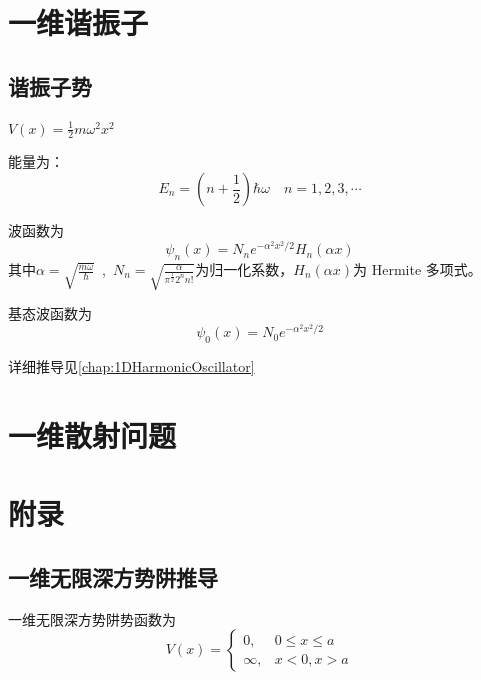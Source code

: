\documentclass[12pt, a4paper, oneside, UTF8]{ctexbook}
\begin{document}
\section{一维谐振子}
\subsection{谐振子势}
$\displaystyle V(x)=\frac{1}{2}m\omega^2x^2$
\hfill
{}

能量为：
\begin{equation}
    E_n=(n+\frac{1}{2})\hbar\omega \quad n=1,2,3,\cdots
\end{equation}

波函数为
\begin{equation}
    \psi_n(x)=N_ne^{-\alpha^2x^2/2}H_n(\alpha x)
\end{equation}
其中$\displaystyle \alpha=\sqrt{\frac{m\omega}{\hbar}}$\ ,\ $\displaystyle N_n=\sqrt{\frac{\alpha}{\pi^{\frac{1}{2}}2^n n!}}$为归一化系数，$H_n(\alpha x)$为 Hermite 多项式。

基态波函数为
\begin{equation}
    \psi_0(x)=N_0e^{-\alpha^2x^2/2}
\end{equation}

详细推导见\ref{chap:1DHarmonicOscillator}







\section{一维散射问题}
\section{附录}
\subsection{一维无限深方势阱推导 \label{chap:1DInfiniteSquarePotentialWell}}
一维无限深方势阱势函数为
\begin{equation}
    V(x)=\begin{cases}
            0,&0\leqslant x \leqslant a \\ 
            \infty ,&x<0, x>a 
        \end{cases}
\end{equation} 
\end{document}
